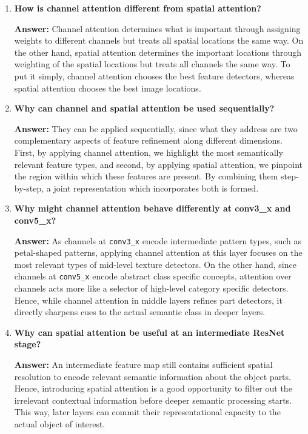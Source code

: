 \documentclass[10pt]{article}
\begin{document}
\begin{enumerate}
\vspace{5mm}

\item \textbf{How is channel attention different from spatial attention?}

\textbf{Answer:} Channel attention determines what is important through assigning weights to different channels but treats all spatial locations the same way. On the other hand, spatial attention determines the important locations through weighting of the spatial locations but treats all channels the same way. To put it simply, channel attention chooses the best feature detectors, whereas spatial attention chooses the best image locations.

\vspace{5mm}

\item \textbf{Why can channel and spatial attention be used sequentially?}

\textbf{Answer:} They can be applied sequentially, since what they address are two complementary aspects of feature refinement along different dimensions. First, by applying channel attention, we highlight the most semantically relevant feature types, and second, by applying spatial attention, we pinpoint the region within which these features are present. By combining them step-by-step, a joint representation which incorporates both is formed.

\vspace{5mm}

\item \textbf{Why might channel attention behave differently at conv3\_x and
conv5\_x?}

\textbf{Answer:} As channels at \texttt{conv3\_x} encode intermediate pattern types, such as petal-shaped patterns, applying channel attention at this layer focuses on the most relevant types of mid-level texture detectors. On the other hand, since channels at \texttt{conv5\_x} encode abstract class specific concepts, attention over channels acts more like a selector of high-level category specific detectors. Hence, while channel attention in middle layers refines part detectors, it directly sharpens cues to the actual semantic class in deeper layers.

\vspace{5mm}

\item \textbf{Why can spatial attention be useful at an intermediate ResNet stage?}

\textbf{Answer:} An intermediate feature map still contains sufficient spatial resolution to encode relevant semantic information about the object parts. Hence, introducing spatial attention is a good opportunity to filter out the irrelevant contextual information before deeper semantic processing starts. This way, later layers can commit their representational capacity to the actual object of interest.


\end{enumerate}
\end{document}
